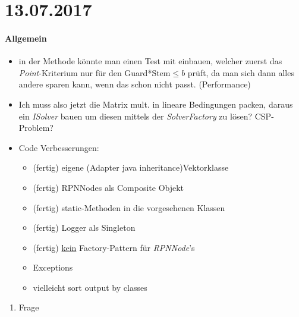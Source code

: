 \section*{13.07.2017}

\paragraph{Allgemein}
\begin{itemize}
	\item in der Methode  könnte man einen Test mit einbauen, welcher zuerst das \emph{Point}-Kriterium nur für den Guard*Stem$\le b$ prüft, da man sich dann alles andere sparen kann, wenn das schon nicht passt. (Performance)
	\item Ich muss also jetzt die Matrix mult. in lineare Bedingungen packen, daraus ein \emph{ISolver} bauen um diesen mittels der \emph{SolverFactory} zu lösen? CSP-Problem?
	\item Code Verbesserungen:
		\begin{itemize}
			\item (fertig) eigene (Adapter java inheritance)Vektorklasse 
			\item (fertig) RPNNodes als Composite Objekt
 			\item (fertig) static-Methoden in die vorgesehenen Klassen
			\item (fertig) Logger als Singleton
			\item (fertig) \underline{kein} Factory-Pattern für \emph{RPNNode}'s
			\item Exceptions
			\item vielleicht sort output by classes
		\end{itemize}
\end{itemize}

\begin{enumerate}
	\item Frage
\end{enumerate}